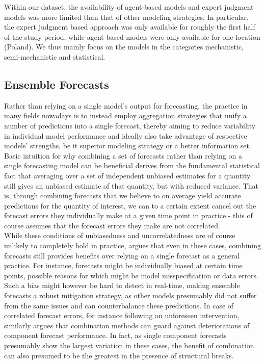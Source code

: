 Within our dataset, the availability of agent-based models and expert judgment models was more limited than that of other modeling strategies. In particular, the expert judgment based approach was only available for roughly the first half of the study period, while agent-based models were only available for one location (Poland). We thus mainly focus on the models in the categories mechanistic, semi-mechanistic and statistical. \\ %
\subsection{Ensemble Forecasts}
Rather than relying on a single model's output for forecasting, the practice in many fields nowadays is to instead employ aggregation strategies that unify %
a number of predictions into a single forecast, thereby aiming to reduce variability in individual model performance and ideally also take advantage of respective models' strengths, be it superior modeling strategy or a better information set.\\
Basic intuition for why combining a set of forecasts rather than relying on a single forecasting model can be beneficial derives from the fundamental statistical fact that averaging over a set of independent unbiased estimates for a quantity still gives an unbiased estimate of that quantity, but with reduced variance. That is, through combining forecasts that we believe to on average yield accurate predictions for the quantity of interest, we can to a certain extent cancel out the forecast errors they individually make at a given time point in practice - this of course assumes that the forecast errors they make are not correlated.\\ 
While these conditions of unbiasedness and uncorrelatedness are of course unlikely to completely hold in practice, \cite{timmermann_chapter_2006} argues that even in these cases, combining forecasts still provides benefits over relying on a single forecast as a general practice. For instance, forecasts might be individually biased at certain time points, possible reasons for which might be model misspecification or data errors. Such a bias might however be hard to detect in real-time, making ensemble forecasts a robust mitigation strategy, as other models presumably did not suffer from the same issues and can counterbalance these predictions. In case of correlated forecast errors, for instance following an unforeseen intervention, \cite{timmermann_chapter_2006} similarly argues that combination methods can guard against deteriorations of component forecast performance. In fact, as single component forecasts presumably show the largest variation in these cases, the benefit of combination can also presumed to be the greatest in the presence of structural breaks. \medskip\\ 
